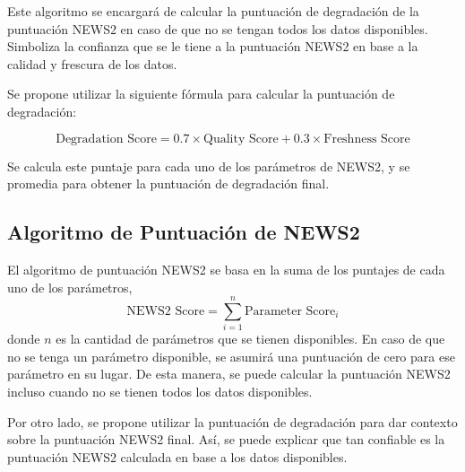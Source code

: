 Este algoritmo se encargará de calcular la puntuación de degradación de la puntuación NEWS2 en caso de que no se tengan todos los datos disponibles.
Simboliza la confianza que se le tiene a la puntuación NEWS2 en base a la calidad y frescura de los datos.\newline

Se propone utilizar la siguiente fórmula para calcular la puntuación de degradación:

\begin{equation}
    \text{Degradation Score} = 0.7 \times \text{Quality Score} + 0.3 \times \text{Freshness Score}
\end{equation}

Se calcula este puntaje para cada uno de los parámetros de NEWS2, y se promedia para obtener la puntuación de degradación final.

\subsection{Algoritmo de Puntuación de NEWS2}

El algoritmo de puntuación NEWS2 se basa en la suma de los puntajes de cada uno de los parámetros,
\begin{equation}
    \text{NEWS2 Score} = \sum_{i=1}^{n} \text{Parameter Score}_i
\end{equation}
donde $n$ es la cantidad de parámetros que se tienen disponibles.
En caso de que no se tenga un parámetro disponible, se asumirá una puntuación de cero para ese parámetro en su lugar.
De esta manera, se puede calcular la puntuación NEWS2 incluso cuando no se tienen todos los datos disponibles.\newline

Por otro lado, se propone utilizar la puntuación de degradación para dar contexto sobre la puntuación NEWS2 final.
Así, se puede explicar que tan confiable es la puntuación NEWS2 calculada en base a los datos disponibles.